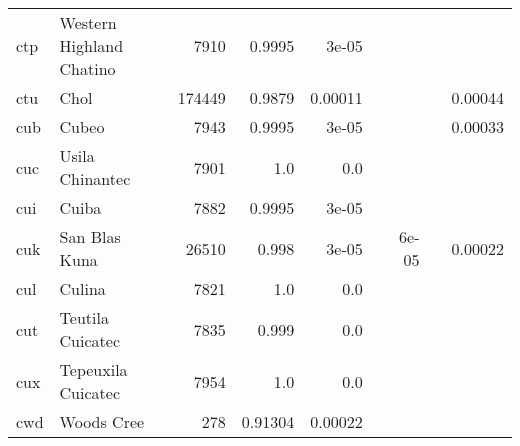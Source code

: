 \documentclass[11pt]{article}
\begin{document}
\begin{table*}[h]
{\begin{tabular}{llrrrrrrr}
ctp         & Western Highland Chatino         & 7910         & 0.9995         & 3e-05         &          &          &          &          \\

ctu         & Chol         & 174449         & 0.9879         & 0.00011         &          &          &          & 0.00044         \\

cub         & Cubeo         & 7943         & 0.9995         & 3e-05         &          &          &          & 0.00033         \\

cuc         & Usila Chinantec         & 7901         & 1.0         & 0.0         &          &          &          &          \\

cui         & Cuiba         & 7882         & 0.9995         & 3e-05         &          &          &          &          \\

cuk         & San Blas Kuna         & 26510         & 0.998         & 3e-05         &          & 6e-05         &          & 0.00022         \\

cul         & Culina         & 7821         & 1.0         & 0.0         &          &          &          &          \\

cut         & Teutila Cuicatec         & 7835         & 0.999         & 0.0         &          &          &          &          \\

cux         & Tepeuxila Cuicatec         & 7954         & 1.0         & 0.0         &          &          &          &          \\

cwd         & Woods Cree         & 278         & 0.91304         & 0.00022         &          &          &          &          \\


\end{tabular}}
\end{table*}
\end{document}
